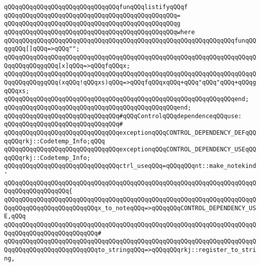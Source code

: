 \newline
\verb|qQQqqQQqqQQqqQQqqQQqqQQqqQQqqQQqfunqQQqlistifyqQQqf|\newline
\verb|qQQqqQQqqQQqqQQqqQQqqQQqqQQqqQQqqQQqqQQqqQQqqQQq=|\newline
\verb|qQQqqQQqqQQqqQQqqQQqqQQqqQQqqQQqqQQqqQQqqQQqqQQqg|\newline
\verb|qQQqqQQqqQQqqQQqqQQqqQQqqQQqqQQqqQQqqQQqqQQqqQQqwhere|\newline
\verb|qQQqqQQqqQQqqQQqqQQqqQQqqQQqqQQqqQQqqQQqqQQqqQQqqQQqqQQqqQQqqQQqfunqQQqgqQQq[]qQQq=>qQQq"";|\newline
\verb|qQQqqQQqqQQqqQQqqQQqqQQqqQQqqQQqqQQqqQQqqQQqqQQqqQQqqQQqqQQqqQQqqQQqqQQqqQQqqQQqgqQQq[x]qQQq=>qQQqfqQQqx;|\newline
\verb|qQQqqQQqqQQqqQQqqQQqqQQqqQQqqQQqqQQqqQQqqQQqqQQqqQQqqQQqqQQqqQQqqQQqqQQqqQQqqQQqgqQQq(xqQQq!qQQqxs)qQQq=>qQQqfqQQqxqQQq+qQQq"qQQq"qQQq+qQQqgqQQqxs;|\newline
\verb|qQQqqQQqqQQqqQQqqQQqqQQqqQQqqQQqqQQqqQQqqQQqqQQqqQQqqQQqqQQqqQQqend;|\newline
\verb|qQQqqQQqqQQqqQQqqQQqqQQqqQQqqQQqqQQqqQQqqQQqqQQqend;|\newline
\newline
\verb|qQQqqQQqqQQqqQQqqQQqqQQqqQQqqQQq#qQQqControlqQQqdependenceqQQquse:|\newline
\verb|qQQqqQQqqQQqqQQqqQQqqQQqqQQqqQQq#|\newline
\verb|qQQqqQQqqQQqqQQqqQQqqQQqqQQqqQQqexceptionqQQqCONTROL_DEPENDENCY_DEFqQQqqQQqrkj::Codetemp_Info;qQQq|\newline
\verb|qQQqqQQqqQQqqQQqqQQqqQQqqQQqqQQqexceptionqQQqCONTROL_DEPENDENCY_USEqQQqqQQqrkj::Codetemp_Info;|\newline
\newline
\verb|qQQqqQQqqQQqqQQqqQQqqQQqqQQqqQQqctrl_useqQQq=qQQqqQQqnt::make_notekind'|\newline
\verb|qQQqqQQqqQQqqQQqqQQqqQQqqQQqqQQqqQQqqQQqqQQqqQQqqQQqqQQqqQQqqQQqqQQqqQQqqQQqqQQqqQQqqQQq{|\newline
\verb|qQQqqQQqqQQqqQQqqQQqqQQqqQQqqQQqqQQqqQQqqQQqqQQqqQQqqQQqqQQqqQQqqQQqqQQqqQQqqQQqqQQqqQQqqQQqqQQqx_to_noteqQQq=>qQQqqQQqCONTROL_DEPENDENCY_USE,qQQq|\newline
\verb|qQQqqQQqqQQqqQQqqQQqqQQqqQQqqQQqqQQqqQQqqQQqqQQqqQQqqQQqqQQqqQQqqQQqqQQqqQQqqQQqqQQqqQQqqQQqqQQq#|\newline
\verb|qQQqqQQqqQQqqQQqqQQqqQQqqQQqqQQqqQQqqQQqqQQqqQQqqQQqqQQqqQQqqQQqqQQqqQQqqQQqqQQqqQQqqQQqqQQqqQQqto_stringqQQq=>qQQqqQQqrkj::register_to_string,|\newline
